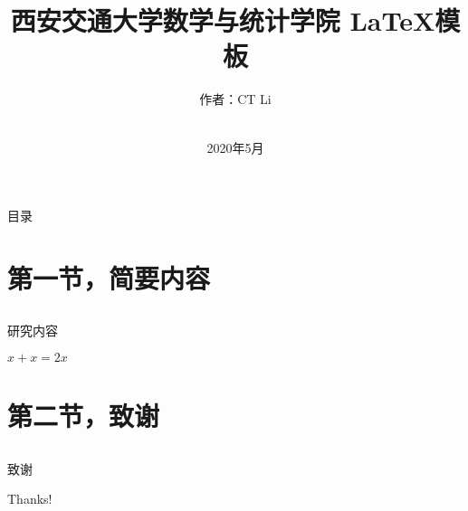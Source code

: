 \documentclass[compress,xcolor=table]{ctexbeamer}
\title{西安交通大学数学与统计学院 \newline LaTeX模板}
\subtitle{} %
\date{~~\\2020年5月}
\author{作者：CT Li}
\begin{document}
\fangsong
\begin{frame}[plain]
	\titlepage
	\setcounter{framenumber}{0}
\end{frame}

\begin{frame}{目录}
	\tableofcontents
\end{frame}

\section{第一节，简要内容} \subsection{}

\begin{frame}{研究内容}

\begin{theorem}
$x+x=2x$
\end{theorem}

\end{frame}

\section{第二节，致谢} \subsection{}


\begin{frame}{致谢}

\begin{center}
{\Huge\calligra Thanks!}
\end{center}

\end{frame}
\end{document}
